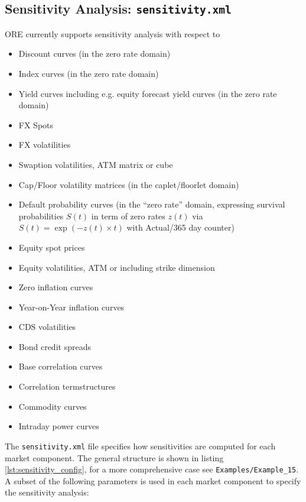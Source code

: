 \subsection{Sensitivity Analysis: {\tt sensitivity.xml}}\label{sec:sensitivity}

ORE currently supports sensitivity analysis with respect to
\begin{itemize}
\item Discount curves  (in the zero rate domain)
\item Index curves (in the zero rate domain)
\item Yield curves including e.g. equity forecast yield curves (in the zero rate domain)
\item FX Spots
\item FX volatilities
\item Swaption volatilities, ATM matrix or cube
\item Cap/Floor volatility matrices (in the caplet/floorlet domain)
\item Default probability curves (in the ``zero rate'' domain, expressing survival probabilities $S(t)$ in term of zero rates $z(t)$ via $S(t)=\exp(-z(t)\times t)$ with Actual/365 day counter)
\item Equity spot prices
\item Equity volatilities, ATM or including strike dimension
\item Zero inflation curves
\item Year-on-Year inflation curves
\item CDS volatilities
\item Bond credit spreads
\item Base correlation curves
\item Correlation termstructures
\item Commodity curves
\item Intraday power curves
\end{itemize}

The {\tt sensitivity.xml} file specifies how sensitivities are computed for each market component.
The general structure is shown in listing \ref{lst:sensitivity_config}, for a more comprehensive case see {\tt Examples/Example\_15}. A subset of the following parameters is used in each market component to specify the sensitivity analysis:

